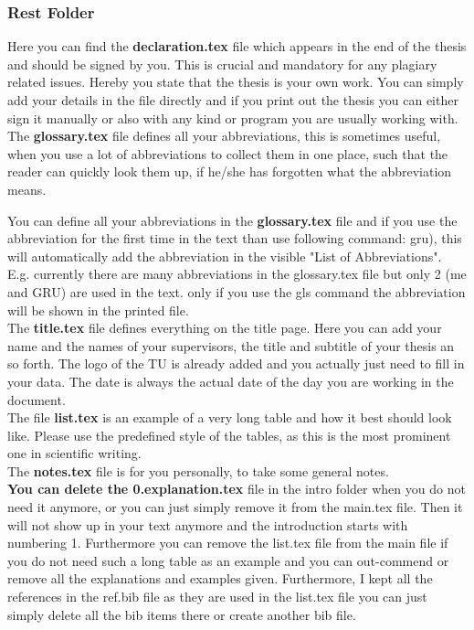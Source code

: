 \subsubsection{Rest Folder}
Here you can find the \textbf{declaration.tex} file which appears in the end of the thesis and should be signed by you. This is crucial and mandatory for any plagiary related issues. Hereby you state that the thesis is your own work. You can simply add your details in the file directly and if you print out the thesis you can either sign it manually or also with any kind or program you are usually working with.\\

The \textbf{glossary.tex} file defines all your abbreviations, this is sometimes useful, when you use a lot of abbreviations to collect them in one place, such that the reader can quickly look them up, if he/she has forgotten what the abbreviation means.

You can define all your abbreviations in the \textbf{glossary.tex} file and if you use the abbreviation for the first time in the text than use following command: \gls{gru}), this will automatically add the abbreviation in the visible "List of Abbreviations". 
E.g. currently there are many abbreviations in the glossary.tex file but only 2 (\gls{me} and GRU) are used in the text. only if you use the gls command the abbreviation will be shown in the printed file. \\

The \textbf{title.tex} file defines everything on the title page. Here you can add your name and the names of your supervisors, the title and subtitle of your thesis an so forth. The logo of the TU is already added and you actually just need to fill in your data. The date is always the actual date of the day you are working in the document. \\

The file \textbf{list.tex} is an example of a very long table and how it best should look like. Please use the predefined style of the tables, as this is the most prominent one in scientific writing. \\

The \textbf{notes.tex} file is for you personally, to take some general notes.\\


\textbf{You can delete the 0.explanation.tex} file in the intro folder when you do not need it anymore, or you can just simply remove it from the main.tex file. Then it will not show up in your text anymore and the introduction starts with numbering 1. Furthermore you can remove the list.tex file from the main file if you do not need such a long table as an example and you can out-commend or remove all the explanations and examples given. Furthermore, I kept all the references in the ref.bib file as they are used in the list.tex file you can just simply delete all the bib items there or create another bib file.
